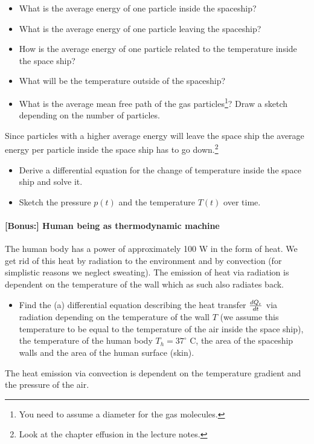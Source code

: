 \documentclass[12pt,a4paper]{article} %
\begin{document}
 \begin{itemize}
 \item What is the average  energy of one particle inside the spaceship?
 \item What is the average  energy of one particle leaving the spaceship?
 \item How is the average energy of one particle related to the temperature inside the space ship?
 \item What will be the temperature outside of the spaceship?
 \item What is the average mean free path of the gas particles\footnote{You need to assume a diameter for the gas molecules.}? Draw a sketch depending on the number of particles.
\end{itemize}
Since particles with a higher average energy will leave the space ship the average energy per particle inside the space ship has to go down.\footnote{Look at the chapter effusion in the lecture notes.}
\begin{itemize}
 \item Derive a differential equation for the change of temperature inside the space ship and solve it.
 \item Sketch the pressure $p(t)$ and the temperature $T(t)$ over time.
\end{itemize}

\paragraph{[Bonus:] Human being as thermodynamic machine}
The human body has a power of approximately 100 W in the form of heat. We get rid of this heat by radiation to the environment and by convection (for simplistic reasons we neglect sweating).
The emission of heat via radiation is dependent on the temperature of the wall which as such also radiates back. 
\begin{itemize}
 \item Find the (a) differential equation describing the heat transfer $\frac{dQ_\textnormal{r}}{dt}$ via radiation depending on the temperature of the wall $T$ (we assume this temperature to be equal to the temperature of the air inside the space ship), the temperature of the human body $T_h = 37^\circ$ C, the area of the spaceship walls and the area of the human surface (skin).
\end{itemize}

The heat emission via convection is dependent on the temperature gradient and the pressure of the air.
\end{document}
